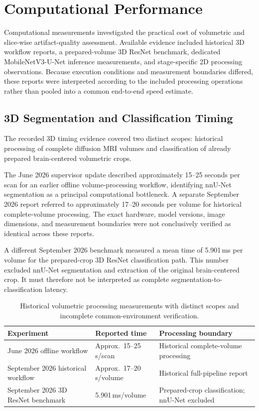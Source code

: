 \section{Computational Performance}
\label{sec:results_computational_performance}

Computational measurements investigated the practical cost of volumetric and slice-wise artifact-quality assessment. Available evidence included historical 3D workflow reports, a prepared-volume 3D ResNet benchmark, dedicated MobileNetV3-U-Net inference measurements, and stage-specific 2D processing observations. Because execution conditions and measurement boundaries differed, these reports were interpreted according to the included processing operations rather than pooled into a common end-to-end speed estimate.

\subsection{3D Segmentation and Classification Timing}
\label{subsec:results_3d_latency}

The recorded 3D timing evidence covered two distinct scopes: historical processing of complete diffusion MRI volumes and classification of already prepared brain-centered volumetric crops.

The June 2026 supervisor update described approximately 15--25 seconds per scan for an earlier offline volume-processing workflow, identifying nnU-Net segmentation as a principal computational bottleneck. A separate September 2026 report referred to approximately 17--20 seconds per volume for historical complete-volume processing. The exact hardware, model versions, image dimensions, and measurement boundaries were not conclusively verified as identical across these reports.

A different September 2026 benchmark measured a mean time of 5.901\,ms per volume for the prepared-crop 3D ResNet classification path. This number excluded nnU-Net segmentation and extraction of the original brain-centered crop. It must therefore not be interpreted as complete segmentation-to-classification latency.

\begin{table}[htbp]
\centering
\caption{Historical volumetric processing measurements with distinct scopes and incomplete common-environment verification.}
\label{tab:results_3d_timing}
\begin{tabular}{p{}p{}p{}}
\hline
Experiment & Reported time & Processing boundary \\
\hline
June 2026 offline workflow & Approx.\ 15--25\,s/scan & Historical complete-volume processing \\
September 2026 historical workflow & Approx.\ 17--20\,s/volume & Historical full-pipeline report \\
September 2026 3D ResNet benchmark & 5.901\,ms/volume & Prepared-crop classification; nnU-Net excluded \\
\hline
\end{tabular}
\end{table}

